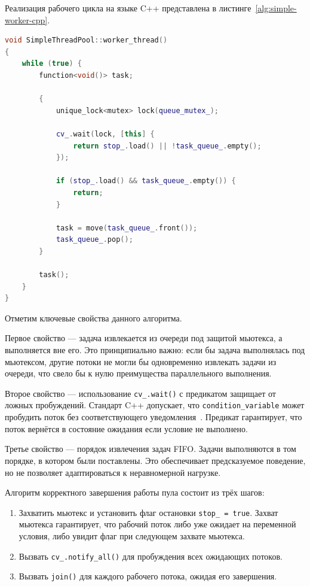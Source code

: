 Реализация рабочего цикла на языке C++ представлена
в листинге~\ref{alg:simple-worker-cpp}.

\begin{lstlisting}[language=C++,
                   caption={Рабочий цикл потока SimpleThreadPool},
                   label={alg:simple-worker-cpp}]
void SimpleThreadPool::worker_thread()
{
    while (true) {
        function<void()> task;

        {
            unique_lock<mutex> lock(queue_mutex_);

            cv_.wait(lock, [this] {
                return stop_.load() || !task_queue_.empty();
            });

            if (stop_.load() && task_queue_.empty()) {
                return;
            }

            task = move(task_queue_.front());
            task_queue_.pop();
        }

        task();
    }
}
\end{lstlisting}

Отметим ключевые свойства данного алгоритма.

Первое свойство --- задача извлекается из очереди под защитой
мьютекса, а выполняется вне его. Это принципиально важно: если
бы задача выполнялась под мьютексом, другие потоки не могли бы
одновременно извлекать задачи из очереди, что свело бы к нулю
преимущества параллельного выполнения.

Второе свойство --- использование \texttt{cv\_.wait()} с предикатом
защищает от ложных пробуждений. Стандарт C++ допускает, что
\texttt{condition\_variable} может пробудить поток без
соответствующего уведомления~\cite{Williams2019}. Предикат
гарантирует, что поток вернётся в состояние ожидания если условие
не выполнено.

Третье свойство --- порядок извлечения задач FIFO. Задачи
выполняются в том порядке, в котором были поставлены. Это
обеспечивает предсказуемое поведение, но не позволяет
адаптироваться к неравномерной нагрузке.

Алгоритм корректного завершения работы пула состоит
из трёх шагов:

\begin{enumerate}
    \item Захватить мьютекс и установить флаг остановки
          \texttt{stop\_ = true}. Захват мьютекса гарантирует,
          что рабочий поток либо уже ожидает на переменной
          условия, либо увидит флаг при следующем захвате
          мьютекса.
    \item Вызвать \texttt{cv\_.notify\_all()} для пробуждения
          всех ожидающих потоков.
    \item Вызвать \texttt{join()} для каждого рабочего потока,
          ожидая его завершения.
\end{enumerate}

